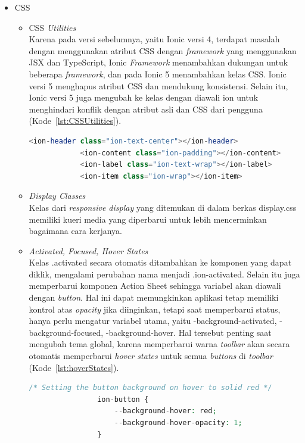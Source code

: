 \begin{enumerate}
	\begin{itemize}
		\item CSS
		\begin{itemize}
			\item CSS {\it Utilities} \\
			Karena pada versi sebelumnya, yaitu Ionic versi 4, terdapat masalah dengan menggunakan atribut CSS dengan {\it framework} yang menggunakan JSX dan TypeScript, Ionic {\it Framework} menambahkan dukungan untuk beberapa {\it framework}, dan pada Ionic 5 menambahkan kelas CSS. Ionic versi 5 menghapus atribut CSS dan mendukung konsistensi. Selain itu, Ionic versi 5 juga mengubah ke kelas dengan diawali ion untuk menghindari konflik dengan atribut asli dan CSS dari pengguna (Kode~\ref{lst:CSSUtilities}).
		\begin{lstlisting}[language=php, label={lst:CSSUtilities}, caption=Contoh Kode Kelas CSS {\it Utility} pada Ionic 5]
			<ion-header class="ion-text-center"></ion-header>
			<ion-content class="ion-padding"></ion-content>
			<ion-label class="ion-text-wrap"></ion-label>
			<ion-item class="ion-wrap"></ion-item>
		\end{lstlisting} 
  
			\item {\it Display Classes} \\ 
			Kelas dari {\it responsive display} yang ditemukan di dalam berkas display.css memiliki kueri media yang diperbarui untuk lebih mencerminkan bagaimana cara kerjanya.

			\item {\it Activated, Focused, Hover States} \\
			Kelas .activated secara otomatis ditambahkan ke komponen yang dapat diklik, mengalami perubahan nama menjadi .ion-activated. Selain itu juga memperbarui komponen Action Sheet sehingga variabel akan diawali dengan {\it button}. Hal ini dapat memungkinkan aplikasi tetap memiliki kontrol atas {\it opacity} jika diinginkan, tetapi saat memperbarui status, hanya perlu mengatur variabel utama, yaitu -background-activated, -background-focused, -background-hover. Hal tersebut penting saat mengubah tema global, karena memperbarui warna {\it toolbar} akan secara otomatis memperbarui {\it hover states} untuk semua {\it buttons} di {\it toolbar} (Kode~\ref{lst:hoverStates}). 
		\begin{lstlisting}[language=php, label={lst:hoverStates}, caption=Contoh Kode {\it Hover States} pada Ionic 5]
			/* Setting the button background on hover to solid red */
				ion-button {
					--background-hover: red;
					--background-hover-opacity: 1;
				}


\end{lstlisting}
\end{itemize}
\end{itemize}
\end{enumerate}
